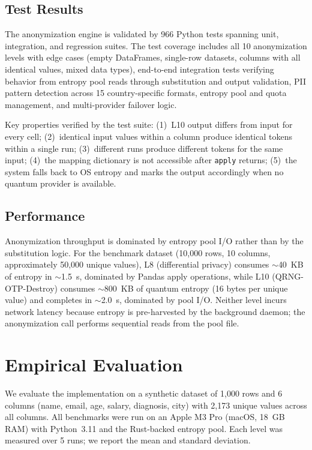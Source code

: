 \documentclass[journal]{IEEEtran}
\begin{document}
\subsection{Test Results}
\label{subsec:tests}

The anonymization engine is validated by 966 Python tests spanning unit, integration, and regression suites. The test coverage includes all 10 anonymization levels with edge cases (empty DataFrames, single-row datasets, columns with all identical values, mixed data types), end-to-end integration tests verifying behavior from entropy pool reads through substitution and output validation, PII pattern detection across 15 country-specific formats, entropy pool and quota management, and multi-provider failover logic.

Key properties verified by the test suite: (1)~L10 output differs from input for every cell; (2)~identical input values within a column produce identical tokens within a single run; (3)~different runs produce different tokens for the same input; (4)~the mapping dictionary is not accessible after \texttt{apply} returns; (5)~the system falls back to OS entropy and marks the output accordingly when no quantum provider is available.

\subsection{Performance}
\label{subsec:perf}

Anonymization throughput is dominated by entropy pool I/O rather than by the substitution logic. For the benchmark dataset (10,000 rows, 10 columns, approximately 50,000 unique values), L8 (differential privacy) consumes ${\sim}$40~KB of entropy in ${\sim}$1.5~s, dominated by Pandas apply operations, while L10 (QRNG-OTP-Destroy) consumes ${\sim}$800~KB of quantum entropy (16 bytes per unique value) and completes in ${\sim}$2.0~s, dominated by pool I/O. Neither level incurs network latency because entropy is pre-harvested by the background daemon; the anonymization call performs sequential reads from the pool file.

\section{Empirical Evaluation}
\label{sec:evaluation}

We evaluate the implementation on a synthetic dataset of 1,000 rows and 6 columns (name, email, age, salary, diagnosis, city) with 2,173 unique values across all columns. All benchmarks were run on an Apple M3 Pro (macOS, 18~GB RAM) with Python~3.11 and the Rust-backed entropy pool. Each level was measured over 5 runs; we report the mean and standard deviation.
\end{document}
